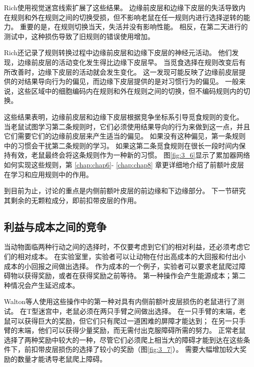 Rich\cite{rich2007prelimbic}使用视觉迷宫线索扩展了这些结果。
边缘前皮层和边缘下皮层的失活导致内在规则和外在规则之间的切换受损，但不影响老鼠在任一规则内进行选择逆转的能力。
重要的是，在规则切换当天，失活并没有影响性能。
相反，在第二天进行的测试中，这种损伤导致了旧规则的错误使用增加。\par


Rich\cite{rich2009rat}还记录了规则转换过程中边缘前皮层和边缘下皮层的神经元活动。
他们发现，边缘前皮层的活动变化发生得比边缘下皮层早。
当觅食选择在规则改变后有所改善时，边缘下皮层的活动就会发生变化。
这一发现可能反映了边缘前皮层提供的对结果导向行为的偏见，而边缘下皮层提供的是对习惯行为的偏见。
一般来说，这些区域中的细胞编码内在规则和外在规则之间的切换，但不编码规则内的切换。\par


这些结果表明，边缘前皮层和边缘下皮层根据竞争坐标系引导觅食规则的变化。
当老鼠试图学习第二条规则时，它们必须使用结果导向的行为来做到这一点，并且它们需要它们的边缘前皮层来产生适当的偏见。
如果没有这种偏见，第一条规则中的习惯会干扰第二条规则的学习。
如果这第二条觅食规则在很长一段时间内保持有效，老鼠最终会将这条规则作为一种新的习惯。
图\ref{fig:3_6}显示了累加器网络如何实现这些规则，第 \ref{chap:chap6}- \ref{chap:chap8} 章更详细地介绍了前额叶皮层在学习和应用规则中的作用。\par


到目前为止，讨论的重点是内侧前额叶皮层的前边缘和下边缘部分。
下一节研究其剩余的无颗粒成分，即前扣带皮层的作用。\par



\subsection{利益与成本之间的竞争}

当动物面临两种行动之间的选择时，不仅要考虑到它们的相对利益，还必须考虑它们的相对成本。
在实验室里，实验者可以让动物在付出高成本的大回报和付出小成本的小回报之间做出选择。
作为成本的一个例子，实验者可以要求老鼠爬过障碍物以获得奖励\cite{salamone1997behavioral}，或者在获得奖励之前等待\cite{cardinal2001impulsive}。
第一种操作会产生能源成本；第二种情况会产生延迟成本。\par


Walton等人\cite{walton2003functional}使用这些操作中的第一种对具有内侧前额叶皮层损伤的老鼠进行了测试。
在T型迷宫中，老鼠必须在两只手臂之间做出选择。
在一只手臂的末端，老鼠可以获得巨大的奖励，但它们只有爬过一道困难的屏障才能达到；
在另一只手臂的末端，他们可以获得少量奖励，而无需付出克服障碍所需的努力。
正常老鼠选择了两种奖励中较大的一种，尽管它们必须爬上相当大的障碍才能到达在这些条件下，前扣带皮层损伤的选择了较小的奖励（图\ref{fig:3_7}）。
需要大幅增加较大奖励的数量才能诱导老鼠爬上障碍\cite{walton2002role}。\par


